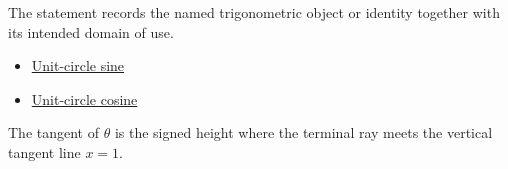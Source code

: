 \begin{remark*}[Interpretation]
The statement records the named trigonometric object or identity together with
its intended domain of use.
\end{remark*}

\begin{dependencies}
\begin{itemize}
  \item \hyperref[def:unit-circle-sine]{Unit-circle sine}
  \item \hyperref[def:unit-circle-cosine]{Unit-circle cosine}
\end{itemize}
\end{dependencies}
\begin{remark*}
The tangent of $\theta$ is the signed height where the terminal ray meets the
vertical tangent line $x=1$.
\end{remark*}
